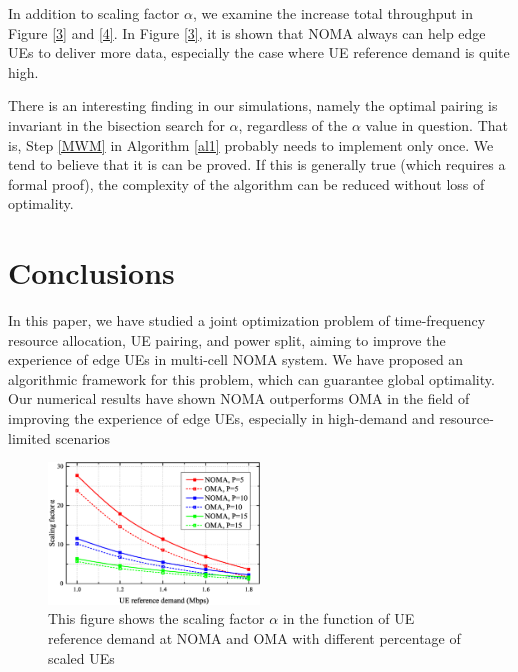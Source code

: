\documentclass[10pt,journal,final,finalsubmission,twocolumn]{IEEEtran}
\begin{document}
In addition to scaling factor $\alpha$, we examine the increase total throughput in Figure \ref{3} and \ref{4}. In Figure \ref{3}, it is shown that NOMA always can help edge UEs to deliver more data, especially the case where UE reference demand is quite high. 

There is an interesting finding in our simulations, namely the optimal pairing is invariant in the bisection search for $\alpha$, regardless of the $\alpha$ value in question. That is, Step \ref{MWM} in Algorithm \ref{al1} probably needs to implement only once. We tend to believe that it is can be proved. If this is generally true (which requires a formal proof), the complexity of the algorithm can be reduced without loss of optimality.





\section{Conclusions}\label{Sec:Conclusions}

In this paper, we have studied a joint optimization problem of time-frequency resource allocation, UE pairing, and power split, aiming to improve the experience of edge UEs in multi-cell NOMA system. We have proposed an algorithmic framework for this problem, which can guarantee global optimality. Our numerical results have shown NOMA outperforms OMA in the field of improving the experience of edge UEs, especially in high-demand and resource-limited scenarios




\begin{figure}
\centering
\includegraphics[width=0.5\textwidth]{1.eps}
\caption{This figure shows the scaling factor $\alpha$ in the function of UE reference demand at NOMA and OMA with different percentage of scaled UEs}
\label{1}
\end{figure}
\end{document}
